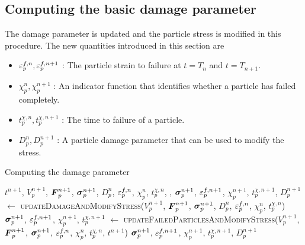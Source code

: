 \subsection{Computing the basic damage parameter}
The damage parameter is updated and the particle stress is modified in this procedure. The new 
quantities introduced in this section are
\begin{itemize} 
  \setlength\itemsep{1pt}
  \item $\varepsilon_p^{f,n}, \varepsilon_p^{f,n+1}$ : {\Ochre The particle strain to failure at $t = T_n$ 
        and $t = T_{n+1}$.}
  \item $\chi_p^{n}, \chi_p^{n+1}$ : {\Ochre An indicator function that identifies whether a particle
        has failed completely.} 
  \item $t_p^{\chi,n}, t_p^{\chi,n+1}$ : {\Ochre The time to failure of a particle.}
  \item $D_p^{n}, D_p^{n+1}$ : {\Ochre A particle damage parameter that can be used to modify the stress.}
\end{itemize}
\begin{breakablealgorithm}
  \caption{Computing the damage parameter}
  \begin{algorithmic}[1]
    \Require $t^{n+1}$, $V_p^{n+1}$, $\boldsymbol{F}_p^{n+1}$, $\boldsymbol{\sigma}_p^{n+1}$, $D_p^n$, $\varepsilon_p^{f,n}$, $\chi^n_p$, 
             $t^{\chi,n}_p$,
             , 
            \State $\boldsymbol{\sigma}_p^{n+1}$, $\varepsilon_p^{f,n+1}$, $\chi^{n+1}_p$, $t^{\chi,n+1}_p$, $D_p^{n+1}$ $\leftarrow$
               \textsc{updateDamageAndModifyStress}($V_p^{n+1}$, $\boldsymbol{F}_p^{n+1}$, \WWRP 
                  $\boldsymbol{\sigma}_p^{n+1}$, $D_p^n$, $\varepsilon_p^{f,n}$, $\chi^n_p$, $t^{\chi,n}_p$)
          \Else
            \State $\boldsymbol{\sigma}_p^{n+1}$, $\varepsilon_p^{f,n+1}$, $\chi^{n+1}_p$, $t^{\chi,n+1}_p$ $\leftarrow$
               \textsc{updateFailedParticlesAndModifyStress}($V_p^{n+1}$, $\boldsymbol{F}_p^{n+1}$, \WWRP 
                  $\boldsymbol{\sigma}_p^{n+1}$, $\varepsilon_p^{f,n}$, $\chi^n_p$, $t^{\chi,n}_p$, $t^{n+1}$)
          \EndIf
        \EndFor
      \EndFor
      \State \Return $\boldsymbol{\sigma}_p^{n+1}$, $\varepsilon_p^{f,n+1}$, $\chi^{n+1}_p$, $t^{\chi,n+1}_p$, $D_p^{n+1}$
    \EndProcedure
  \end{algorithmic}
\end{breakablealgorithm}

